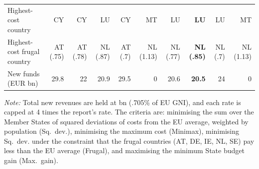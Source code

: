 \begin{table}[htbp]
\begin{tabular}{@{}l*{9}{r}@{}}
Highest-cost country & CY & CY & LU & CY & MT & LU & \textbf{LU} & LU & MT \\
Highest-cost frugal country & AT (.75) & AT (.78) & NL (.87) & AT (.7) & NL (1.13) & NL (.77) & \textbf{NL (.85)} & NL (.7) & NL (1.13) \\
New funds (EUR bn) & 29.8 & 22 & 20.9 & 29.5 & 0 & 20.6 & \textbf{20.5} & 24 & 0 \\
\bottomrule
\end{tabular}
\begin{minipage}{\textwidth}\vspace{4pt}\footnotesize \textit{Note:} Total new revenues are held at  bn (.705\% of EU GNI), and each rate is capped at 4 times the report's rate. The criteria are: minimising the sum over the Member States of squared deviations of costs from the EU average, weighted by population (Sq.\ dev.), minimising the maximum cost (Minimax), minimising Sq.\ dev. under the constraint that the frugal countries (AT, DE, IE, NL, SE) pay less than the EU average (Frugal), and maximising the minimum State budget gain (Max.\ gain). \end{minipage}
\end{table}
